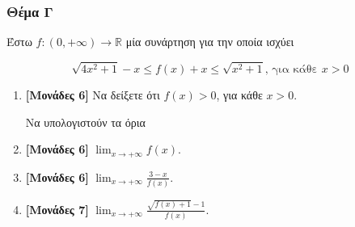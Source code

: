 \documentclass[12pt]{article}
\begin{document}
  \section*{Θέμα Γ}
    \noindent
    Έστω $f:(0,+\infty)\to \mathbb{R}$ μία συνάρτηση για την οποία ισχύει

    $$\sqrt{4x^2+1}-x\le f(x)+x\le \sqrt{x^2+1} \text{, για κάθε } x>0$$

    \begin{enumerate}
      \item \textbf{[Μονάδες 6]} Να δείξετε ότι $f(x)>0$, για κάθε $x>0$.

      Να υπολογιστούν τα όρια
      \item \textbf{[Μονάδες 6]} $\lim_{x\to +\infty}f(x)$.
      \item \textbf{[Μονάδες 6]} $\lim_{x\to +\infty}\frac{3-x}{f(x)}$.
      \item \textbf{[Μονάδες 7]} $\lim_{x\to +\infty}\frac{\sqrt{f(x)+1}-1}{f(x)}$.
    \end{enumerate}

\vspace{3\baselineskip}

\part*{}
\end{document}
